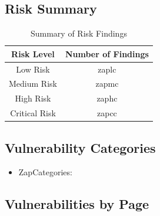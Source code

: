 \documentclass[12pt]{article}
\begin{document}
\subsection{Risk Summary}
\begin{table}[h!]
\centering
\renewcommand{\arraystretch}{1.5}
\begin{tabular}{|c|c|}
\hline
\textbf{Risk Level} & \textbf{Number of Findings} \\
\hline
Low Risk & zaplc \\ 
\hline
Medium Risk & zapmc \\ 
\hline
High Risk & zaphc \\ 
\hline
Critical Risk & zapcc \\ 
\hline
\end{tabular}
\caption{Summary of Risk Findings}
\label{tab:risk_summary}
\end{table}

\subsection{Vulnerability Categories}
\begin{itemize}
\item ZapCategories:
\end{itemize}

\subsection{Vulnerabilities by Page}
\end{document}
